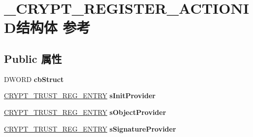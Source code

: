 \hypertarget{struct___c_r_y_p_t___r_e_g_i_s_t_e_r___a_c_t_i_o_n_i_d}{}\section{\+\_\+\+C\+R\+Y\+P\+T\+\_\+\+R\+E\+G\+I\+S\+T\+E\+R\+\_\+\+A\+C\+T\+I\+O\+N\+I\+D结构体 参考}
\label{struct___c_r_y_p_t___r_e_g_i_s_t_e_r___a_c_t_i_o_n_i_d}
\subsection*{Public 属性}
\begin{DoxyCompactItemize}
\item 
\mbox{\label{struct___c_r_y_p_t___r_e_g_i_s_t_e_r___a_c_t_i_o_n_i_d_ae32ceb7bea76c8dd886a968c8b2e5c08}} 
D\+W\+O\+RD {\bfseries cb\+Struct}
\item 
\mbox{\label{struct___c_r_y_p_t___r_e_g_i_s_t_e_r___a_c_t_i_o_n_i_d_a208e9b1e9b3dca12cbd711bcfebc6ae0}} 
\hyperlink{struct___c_r_y_p_t___t_r_u_s_t___r_e_g___e_n_t_r_y}{C\+R\+Y\+P\+T\+\_\+\+T\+R\+U\+S\+T\+\_\+\+R\+E\+G\+\_\+\+E\+N\+T\+RY} {\bfseries s\+Init\+Provider}
\item 
\mbox{\label{struct___c_r_y_p_t___r_e_g_i_s_t_e_r___a_c_t_i_o_n_i_d_ae5d9a9d53b3a173421e46073cefcb833}} 
\hyperlink{struct___c_r_y_p_t___t_r_u_s_t___r_e_g___e_n_t_r_y}{C\+R\+Y\+P\+T\+\_\+\+T\+R\+U\+S\+T\+\_\+\+R\+E\+G\+\_\+\+E\+N\+T\+RY} {\bfseries s\+Object\+Provider}
\item 
\mbox{\label{struct___c_r_y_p_t___r_e_g_i_s_t_e_r___a_c_t_i_o_n_i_d_aefc858329ac0e735c36d0e092cffc9b3}} 
\hyperlink{struct___c_r_y_p_t___t_r_u_s_t___r_e_g___e_n_t_r_y}{C\+R\+Y\+P\+T\+\_\+\+T\+R\+U\+S\+T\+\_\+\+R\+E\+G\+\_\+\+E\+N\+T\+RY} {\bfseries s\+Signature\+Provider}
\item 
\mbox{\label{struct___c_r_y_p_t___r_e_g_i_s_t_e_r___a_c_t_i_o_n_i_d_a1792d7b5d60937d51a22e775339a4213}} 

\end{DoxyCompactItemize}
